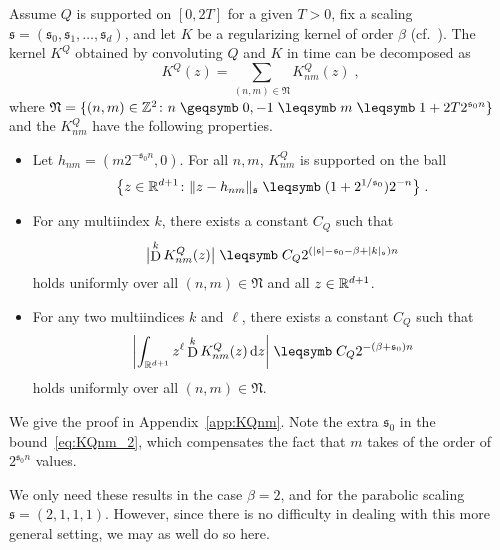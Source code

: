 \documentclass[reqno,11pt]{article}
\def\fraks{\mathfrak{s}}
\def\abss#1{\abs{#1}_\mathfrak{s}}
\DeclareMathOperator{\D}{D}            %
\begin{document}
\begin{prop}
\label{prop:KQnm} 
Assume $Q$ is supported on $[0,2T]$ for a given $T>0$, fix a scaling
$\fraks=(\fraks_0,\fraks_1,\dots,\fraks_d)$, and let $K$ be a regularizing
kernel of order $\beta$ (cf.~\cite[Ass.~5.1]{Hairer2014}). The kernel $K^Q$ 
obtained by convoluting $Q$ and $K$ in time can be decomposed as 
\begin{equation}
 K^Q(z) = \sum_{(n,m)\in\mathfrak{N}} K^Q_{nm}(z)\;,
\end{equation} 
where $\mathfrak{N} = \setsuch{(n,m)\in\Z^2}{n\geqs0, -1\leqs m \leqs
1+2T2^{\fraks_{0}n}}$ 
and the $K^Q_{nm}$ have the following properties.
\begin{itemize}
\item 	Let $h_{nm} = (m2^{-\fraks_0n},0)$. 
For all $n,m$, $K^Q_{nm}$ is supported on the ball
\begin{equation}
\label{eq:KQnm_1} 
 \bigsetsuch{z\in\R^{d+1}}
 {\norm{z - h_{nm}}_\fraks \leqs (1+2^{1/\fraks_0})2^{-n}}\;.
\end{equation} 

\item 	For any multiindex $k$, there exists a constant $C_Q$ such that 
\begin{equation}
\label{eq:KQnm_2} 
 \bigabs{\D^k K^Q_{nm}(z)} \leqs C_Q 2^{(\abs{\fraks}-\fraks_0-\beta+\abss{k})n}
\end{equation} 
holds uniformly over all $(n, m)\in\mathfrak{N}$ and all $z\in\mathbb{R}^{d+1}$. 

\item 	For any two multiindices $k$ and $\ell$, there exists a constant $C_Q$
such that 
\begin{equation}
\label{eq:KQnm_3} 
 \biggabs{\int_{\R^{d+1}}z^\ell \D^k K^Q_{nm}(z)\6z} 
 \leqs C_Q 2^{-(\beta+\fraks_0)n}
\end{equation} 
holds uniformly over all $(n, m)\in\mathfrak{N}$.
\end{itemize}
\end{prop}

We give the proof in Appendix~\ref{app:KQnm}. 
Note the extra $\fraks_0$ in the bound~\eqref{eq:KQnm_2}, which compensates the
fact that $m$ takes of the order of $2^{\fraks_0 n}$ values. 

\begin{remark}
We only need these results in the case $\beta=2$, and for the parabolic scaling
$\fraks=(2,1,1,1)$. However, since there is no difficulty in dealing with this
more general setting, we may as well do so here.   
\end{remark}
\end{document}
